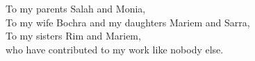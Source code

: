 \begin{dedicace}
To my parents Salah and Monia,\\
To my wife Bochra and my daughters Mariem and Sarra,\\
To my sisters Rim and Mariem,\\
who have contributed to my work like nobody else.
\\~
\\
\end{dedicace}
